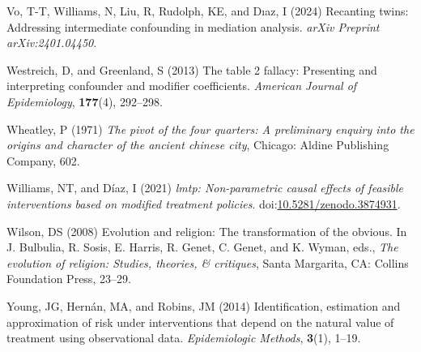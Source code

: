 \documentclass[
  single column]{article}
\newlength{\cslhangindent}
\newenvironment{CSLReferences}[2] %
 {\begin{list}{}{%
  \setlength{\itemindent}{0pt}
  \setlength{\leftmargin}{0pt}
  \setlength{\parsep}{0pt}
  \ifodd #1
   \setlength{\leftmargin}{\cslhangindent}
   \setlength{\itemindent}{-1\cslhangindent}
  \fi
  \setlength{\itemsep}{#2\baselineskip}}}
 {\end{list}}
\begin{document}
\begin{CSLReferences}{1}{0}
Vo, T-T, Williams, N, Liu, R, Rudolph, KE, and Dıaz, I (2024) Recanting
twins: Addressing intermediate confounding in mediation analysis.
\emph{arXiv Preprint arXiv:2401.04450}.

Westreich, D, and Greenland, S (2013) The table 2 fallacy: Presenting
and interpreting confounder and modifier coefficients. \emph{American
Journal of Epidemiology}, \textbf{177}(4), 292--298.

Wheatley, P (1971) \emph{The pivot of the four quarters: A preliminary
enquiry into the origins and character of the ancient chinese city},
Chicago: Aldine Publishing Company, 602.

Williams, NT, and Díaz, I (2021) \emph{{l}mtp: Non-parametric causal
effects of feasible interventions based on modified treatment policies}.
doi:\href{https://doi.org/10.5281/zenodo.3874931}{10.5281/zenodo.3874931}.

Wilson, DS (2008) Evolution and religion: The transformation of the
obvious. In J. Bulbulia, R. Sosis, E. Harris, R. Genet, C. Genet, and K.
Wyman, eds., \emph{The evolution of religion: Studies, theories, \&
critiques}, Santa Margarita, CA: Collins Foundation Press, 23--29.

Young, JG, Hernán, MA, and Robins, JM (2014) Identification, estimation
and approximation of risk under interventions that depend on the natural
value of treatment using observational data. \emph{Epidemiologic
Methods}, \textbf{3}(1), 1--19.

\end{CSLReferences}
\end{document}
